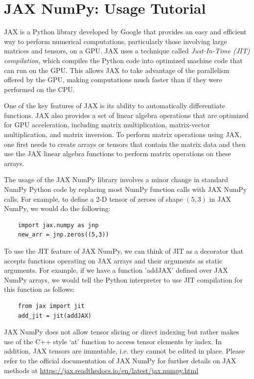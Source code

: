 \section{\label{appendix:JAX}JAX NumPy: Usage Tutorial}

JAX is a Python library developed by Google that provides an easy and efficient way to perform numerical computations, particularly those involving large matrices and tensors, on a GPU. JAX uses a technique called \textit{Just-In-Time (JIT) compilation}, which compiles the Python code into optimized machine code that can run on the GPU. This allows JAX to take advantage of the parallelism offered by the GPU, making computations much faster than if they were performed on the CPU.

One of the key features of JAX is its ability to automatically differentiate functions. JAX also provides a set of linear algebra operations that are optimized for GPU acceleration, including matrix multiplication, matrix-vector multiplication, and matrix inversion. To perform matrix operations using JAX, one first needs to create arrays or tensors that contain the matrix data and then use the JAX linear algebra functions to perform matrix operations on these arrays. 

The usage of the JAX NumPy library involves a minor change in standard NumPy Python code by replacing most NumPy function calls with JAX NumPy calls. For example, to define a 2-D tensor of zeroes of shape $(5,3)$ in JAX NumPy, we would do the following:

\begin{verbatim}
    import jax.numpy as jnp
    new_arr = jnp.zeros((5,3))
\end{verbatim}

To use the JIT feature of JAX NumPy, we can think of JIT as a decorator that accepts functions operating on JAX arrays and their arguments as static arguments. For example, if we have a function 'addJAX' defined over JAX NumPy arrays, we would tell the Python interpreter to use JIT compilation for this function as follows:

\begin{verbatim}
    from jax import jit
    add_jit = jit(addJAX)
\end{verbatim}

JAX NumPy does not allow tensor slicing or direct indexing but rather makes use of the C++ style `at' function to access tensor elements by index. In addition, JAX tensors are immutable, i.e. they cannot be edited in place. Please refer to the official documentation of JAX NumPy for further details on JAX methods at \url{https://jax.readthedocs.io/en/latest/jax.numpy.html}


